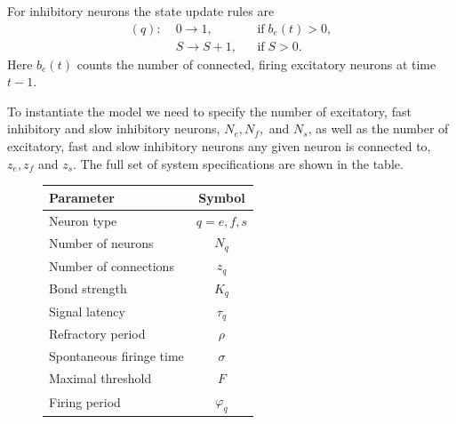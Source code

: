 \documentclass[12pt]{article}
\numberwithin{equation}{section}
\begin{document}
For inhibitory neurons the state update rules are
\begin{align}
(q): \; & 0 \rightarrow 1, && \mathrm{if} \; b_e(t) > 0, \\
& S \rightarrow S + 1, && \mathrm{if} \; S > 0.
\end{align}
Here \(b_e(t)\) counts the number of connected, firing excitatory neurons at time \(t-1\). 
%
%


To instantiate the model we need to specify the number of excitatory, fast inhibitory and slow inhibitory neurons, \(N_e, N_f,\) and \( N_s\), as well as the number of excitatory, fast and slow inhibitory neurons any given neuron is connected to, \(z_e, z_f\) and \(z_s\). The full set of system specifications are shown in the table.
\begin{figure}[H]
\centering
\begin{tabular}{ l | c  }
  Parameter &Symbol \\
\hline 
Neuron type & \(q = e,f,s\) \\
\hline
 Number of neurons & \(N_q\) \\
\hline
Number of connections & \(z_q\) \\
\hline
Bond strength & \(K_q\) \\
\hline 
Signal latency & \(\tau_q\) \\
\hline
Refractory period & \(\rho\) \\
\hline
Spontaneous firinge time & \(\sigma\) \\
\hline 
Maximal threshold & \(F\) \\
\hline 
Firing period & \(\varphi_q\) \\
\hline 
\end{tabular}
\end{figure}
\end{document}
